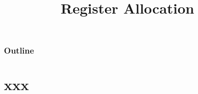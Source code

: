 \documentclass[8pt,a4paper,compress]{beamer}
\title{Register Allocation}
\date{}
\begin{document}
\begin{frame}
\vfill
\titlepage
\end{frame}

\begin{frame}
\frametitle{Outline}
\tableofcontents
\end{frame}

\section{xxx}
\begin{frame}[fragile]
\pause


\end{frame}
\end{document}
